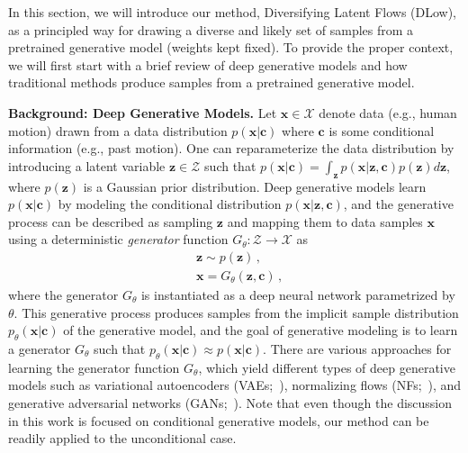 \documentclass[runningheads]{llncs}
\begin{document}
	In this section, we will introduce our method, Diversifying Latent Flows (DLow), as a principled way for drawing a diverse and likely set of samples from a pretrained generative model (weights kept fixed). To provide the proper context, we will first start with a brief review of deep generative models and how traditional methods produce samples from a pretrained generative model.
	
	\vspace{2mm}
	\noindent\textbf{Background: Deep Generative Models.} 
	Let $\mathbf{x} \in \mathcal{X}$ denote data (e.g., human motion) drawn from a data distribution $p(\mathbf{x}|\mathbf{c})$ where $\mathbf{c}$ is some conditional information (e.g., past motion). One can reparameterize the data distribution by introducing a latent variable $\mathbf{z} \in \mathcal{Z}$ such that $p(\mathbf{x}|\mathbf{c}) = \int_\mathbf{z} p(\mathbf{x}|\mathbf{z}, \mathbf{c}) p(\mathbf{z})d\mathbf{z}$, where $p(\mathbf{z})$ is a Gaussian prior distribution. Deep generative models learn $p(\mathbf{x}|\mathbf{c})$ by modeling the conditional distribution $p(\mathbf{x}|\mathbf{z}, \mathbf{c})$, and the generative process can be described as sampling $\mathbf{z}$ and mapping them to data samples $\mathbf{x}$ using a deterministic \emph{generator} function $G_\theta: \mathcal{Z} \rightarrow \mathcal{X}$ as
	\begin{align}
	\label{eq:p_z}
	&\mathbf{z} \sim p(\mathbf{z})\,, \\
	\label{eq:G_theta}
	&\mathbf{x} = G_\theta(\mathbf{z}, \mathbf{c})\,,
	\end{align}
	where the generator $G_\theta$ is instantiated as a deep neural network parametrized by $\theta$. This generative process produces samples from the implicit sample distribution $p_\theta(\mathbf{x}|\mathbf{c})$ of the generative model, and the goal of generative modeling is to learn a generator $G_\theta$ such that $p_\theta(\mathbf{x}|\mathbf{c}) \approx p(\mathbf{x}|\mathbf{c})$. There are various approaches for learning the generator function $G_\theta$, which yield different types of deep generative models such as variational autoencoders (VAEs;~\cite{kingma2013auto}), normalizing flows (NFs;~\cite{rezende2015variational}), and generative adversarial networks (GANs;~\cite{goodfellow2014generative}). Note that even though the discussion in this work is focused on conditional generative models, our method can be readily applied to the unconditional case.
	
\end{document}
